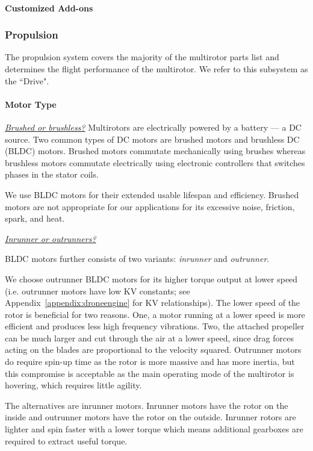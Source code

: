 \paragraph{Customized Add-ons}

\subsubsection{Propulsion}

The propulsion system covers the majority of the multirotor parts list and determines the flight performance of the multirotor. We refer to this subsystem as the ``Drive".

\paragraph{Motor Type}

\underline{\textit{Brushed or brushless?}}
Multirotors are electrically powered by a battery --- a DC source. Two common types of DC motors are  brushed motors and brushless DC (BLDC) motors. Brushed motors commutate mechanically using brushes whereas brushless motors commutate electrically using electronic controllers that switches phases in the stator coils.

We use  BLDC motors for their extended usable lifespan and efficiency. Brushed motors are not appropriate for our applications for its excessive noise, friction, spark, and heat.

\underline{\textit{Inrunner or outrunners?}}

BLDC motors further consists of two variants: \textit{inrunner} and \textit{outrunner}. 

We choose outrunner BLDC motors for its higher torque output at lower speed  (i.e. outrunner motors have low KV constants; see Appendix~\ref{appendix:droneengine} for KV relationships). The lower speed of the rotor is beneficial for two reasons. One, a motor running at a lower speed is more efficient and produces less high frequency vibrations. Two, the attached propeller can be much larger and cut through the air at a lower speed, since drag forces acting on the blades are proportional to the velocity squared. Outrunner motors do require spin-up time as the rotor is more massive and has more inertia, but this compromise is acceptable as the main operating mode of the multirotor is hovering, which requires little agility. 

The alternatives are inrunner motors. Inrunner motors have the rotor on the inside and outrunner motors have the rotor on the outside. Inrunner rotors are lighter and spin faster with a lower torque which means additional gearboxes are required to extract useful torque\cite{invsoutrunner}.

